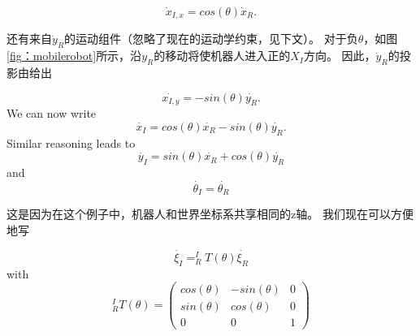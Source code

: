 \begin{equation}
\dot{x}_{I,x}=cos(\theta) \dot{x}_R.
\end{equation}


还有来自$ \dot {y} _R $的运动组件（忽略了现在的运动学约束，见下文）。 对于负$ \theta $，如图\ref {fig：mobilerobot}所示，沿$ y_R $的移动将使机器人进入正的$ X_I $方向。 因此，$ \dot {y} _R $的投影由给出

\begin{equation}
\dot{x_{I,y}}=-sin(\theta)\dot{y_R}.
\end{equation} 
We can now write
\begin{equation}
\dot{x_I}=cos(\theta) \dot{x_R} - sin(\theta) \dot{y_R}.
\end{equation}
Similar reasoning leads to
\begin{equation}
\dot{y_I}=sin(\theta) \dot{x_R} + cos(\theta) \dot{y_R}
\end{equation}
and
\begin{equation}
\dot{\theta_I}=\dot{\theta_R}
\end{equation}

这是因为在这个例子中，机器人和世界坐标系共享相同的z轴。 我们现在可以方便地写

\begin{equation}
\dot{\xi_I}=^I_RT(\theta)\dot{\xi_R}
\end{equation}
with
\begin{equation}
^I_RT(\theta)=\left(\begin{array}{ccc}
cos(\theta) & -sin(\theta) & 0 \\
sin(\theta) & cos(\theta) & 0 \\
0 & 0 & 1\end{array}\right)
\end{equation}



